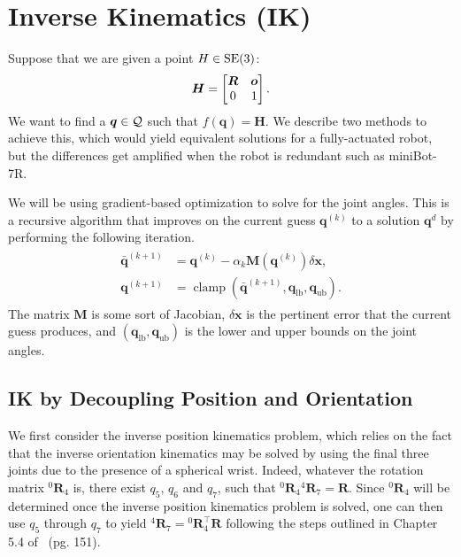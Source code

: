 \section{Inverse Kinematics (IK)}
\label{sec:inversekin}

Suppose that we are given a point $H \in \mathrm{SE}(3)$: 
\[ \bm{H} = \begin{bmatrix}\bm{R} & \bm{o} \\ 0 & 1\end{bmatrix}. \]
We want to find a $\bm{q} \in \mathcal{Q}$ such that $f(\bm{q}) = \bm{H}$. We
describe two methods to achieve this, which would yield equivalent solutions for
a fully-actuated robot, but the differences get amplified when the robot is
redundant such as miniBot-7R.

We will be using gradient-based optimization to solve for the joint angles. This
is a recursive algorithm that improves on the current guess $\bm{q}^{(k)}$ to
a solution $\bm{q}^d$ by performing the following iteration.
%
\begin{align}
  \begin{split}
  \bar{\bm{q}}^{(k+1)} &= \bm{q}^{(k)} - \alpha_k \bm{M}\left(\bm{q}^{(k)}\right)\delta \bm{x}, \\
  \bm{q}^{(k+1)} &= \operatorname{clamp}\left(\bar{\bm{q}}^{(k+1)}, \bm{q}_{\text{lb}}, \bm{q}_{\text{ub}} \right).
  \end{split}
  \label{eq:gd}
\end{align}
%
The matrix $\bm{M}$ is some sort of Jacobian, $\delta \bm{x}$ is the pertinent 
error that the current guess produces, and $(\bm{q}_{\text{lb}},
\bm{q}_{\text{ub}})$ is the lower and upper bounds on the joint angles.

\subsection{IK by Decoupling Position and Orientation}
\label{ssec:ik_decoupling}

We first consider the inverse position kinematics problem, 
which relies on the fact that the inverse orientation kinematics may be solved
by using the final three joints due to the presence of a spherical wrist.
Indeed, whatever the 
rotation matrix $^0\bm{R}_4$ is, there exist $q_5$, $q_6$ and $q_7$, such that
${}^0\bm{R}_4 {}^4\bm{R}_7 = \bm{R}$. Since ${}^0\bm{R}_4$ will be determined
once the inverse position kinematics problem is solved, one can then use $q_5$
through $q_7$ to yield ${}^4\bm{R}_7 = {}^0\bm{R}_4^\top\bm{R}$ following the 
steps outlined in Chapter 5.4 of~\cite{spong2020robot} (pg. 151).

